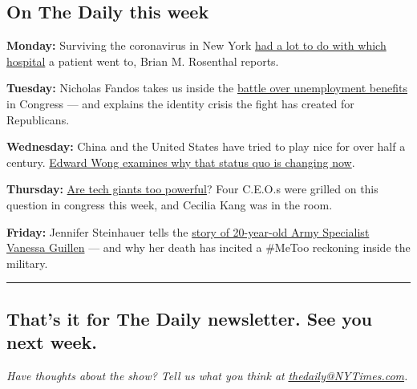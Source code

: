 \hypertarget{on-the-daily-this-week}{%
\subsection{On The Daily this week}\label{on-the-daily-this-week}}

\textbf{Monday:} Surviving the coronavirus in New York
\href{https://www.nytimes3xbfgragh.onion/2020/07/27/podcasts/the-daily/new-york-hospitals-covid.html}{had
a lot to do with which hospital} a patient went to, Brian M. Rosenthal
reports.

\textbf{Tuesday:} Nicholas Fandos takes us inside the
\href{https://www.nytimes3xbfgragh.onion/2020/07/28/podcasts/the-daily/unemployment-benefits-coronavirus.html}{battle
over unemployment benefits} in Congress --- and explains the identity
crisis the fight has created for Republicans.

\textbf{Wednesday:} China and the United States have tried to play nice
for over half a century.
\href{https://www.nytimes3xbfgragh.onion/2020/07/29/podcasts/the-daily/china-trump-foreign-policy.html}{Edward
Wong examines why that status quo is changing now}.

\textbf{Thursday:}
\href{https://www.nytimes3xbfgragh.onion/2020/07/30/podcasts/the-daily/congress-facebook-amazon-google-apple.html}{Are
tech giants too powerful}? Four C.E.O.s were grilled on this question in
congress this week, and Cecilia Kang was in the room.

\textbf{Friday:} Jennifer Steinhauer tells the
\href{https://www.nytimes3xbfgragh.onion/2020/07/31/podcasts/the-daily/vanessa-guillen-military-metoo.html}{story
of 20-year-old Army Specialist Vanessa Guillen} --- and why her death
has incited a \#MeToo reckoning inside the military.

\begin{center}\rule{0.5\linewidth}{\linethickness}\end{center}

\hypertarget{thats-it-for-the-daily-newsletter-see-you-next-week}{%
\subsection{That's it for The Daily newsletter. See you next
week.}\label{thats-it-for-the-daily-newsletter-see-you-next-week}}

\emph{Have thoughts about the show? Tell us what you think at}
\href{mailto:thedaily@NYTimes.com?subject=The\%20Daily\%20newsletter}{\emph{thedaily@NYTimes.com}}\emph{.}

